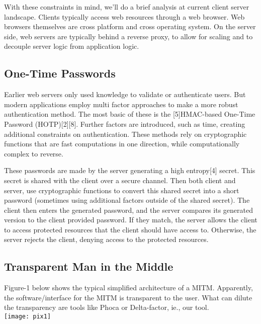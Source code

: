 \documentclass[a4paper, 11pt]{article} 				%
\begin{document}
With these constraints in mind, we'll do a brief analysis at current client server landscape. Clients typically access web resources through a web browser. Web browsers themselves are cross platform and cross operating system. On the server side, web servers are typically behind a reverse proxy, to allow for scaling and to decouple server logic from application logic. 

\subsection{One-Time Passwords}
Earlier web servers only used knowledge to validate or authenticate users. But modern applications employ multi factor approaches to make a more robust authentication method. The most basic of these is the [5]HMAC-based One-Time Password (HOTP)[2][8]. Further factors are introduced, such as time, creating additional constraints on authentication. These methods rely on cryptographic functions that are fast computations in one direction, while computationally complex to reverse.

These passwords are made by the server generating a high entropy[4] secret. This secret is shared with the client over a secure channel. Then both client and server, use cryptographic functions to convert this shared secret into a short password (sometimes using additional factors outside of the shared secret). The client then enters the generated password, and the server compares its generated version to the client provided password. If they match, the server allows the client to access protected resources that the client should have access to. Otherwise, the server rejects the client, denying access to the protected resources.

\subsection{Transparent Man in the Middle}
Figure-1 below shows the typical simplified architecture of a MITM. 
Apparently, the software/interface for the MITM is transparent to the user. What can dilute the transparency are tools like Phoca or Delta-factor, ie., our tool.\\

\texttt{[image: pix1]}
  
\end{document}
